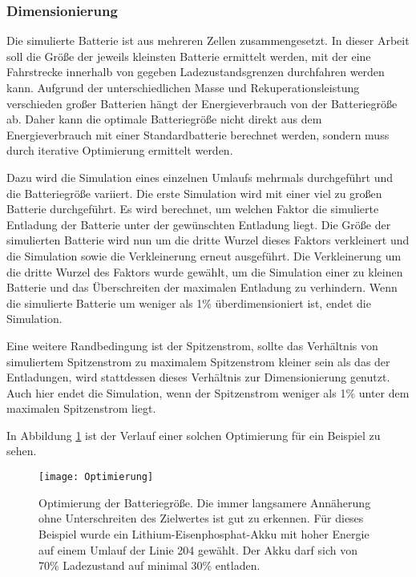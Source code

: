 \subsubsection{Dimensionierung}

Die simulierte Batterie ist aus mehreren Zellen zusammengesetzt. In dieser Arbeit soll die Größe der jeweils kleinsten Batterie ermittelt werden, mit der eine Fahrstrecke innerhalb von gegeben Ladezustandsgrenzen durchfahren werden kann. Aufgrund der unterschiedlichen Masse und Rekuperationsleistung verschieden großer Batterien hängt der Energieverbrauch von der Batteriegröße ab. Daher kann die optimale Batteriegröße nicht direkt aus dem Energieverbrauch mit einer Standardbatterie berechnet werden, sondern muss durch iterative Optimierung ermittelt werden.

Dazu wird die Simulation eines einzelnen Umlaufs mehrmals durchgeführt und die Batteriegröße variiert. Die erste Simulation wird mit einer viel zu großen Batterie durchgeführt. Es wird berechnet, um welchen Faktor die simulierte Entladung der Batterie unter der gewünschten Entladung liegt. Die Größe der simulierten Batterie wird nun um die dritte Wurzel dieses Faktors verkleinert und die Simulation sowie die Verkleinerung erneut ausgeführt. Die Verkleinerung um die dritte Wurzel des Faktors wurde gewählt, um die Simulation einer zu kleinen Batterie und das Überschreiten der maximalen Entladung zu verhindern. Wenn die simulierte Batterie um weniger als 1\% überdimensioniert ist, endet die Simulation.

Eine weitere Randbedingung ist der Spitzenstrom, sollte das Verhältnis von simuliertem Spitzenstrom zu maximalem Spitzenstrom kleiner sein als das der Entladungen, wird stattdessen dieses Verhältnis zur Dimensionierung genutzt. Auch hier endet die Simulation, wenn der Spitzenstrom weniger als 1\% unter dem maximalen Spitzenstrom liegt.

In Abbildung \ref{abb_Optimierung} ist der Verlauf einer solchen Optimierung für ein Beispiel zu sehen.

\begin{figure}\centering
	\texttt{[image: Optimierung]}
	\caption[Optimierung der Batteriegröße]{Optimierung der Batteriegröße. Die immer langsamere Annäherung ohne Unterschreiten des Zielwertes ist gut zu erkennen. Für dieses Beispiel wurde ein Lithium-Eisenphosphat-Akku mit hoher Energie auf einem Umlauf der Linie 204 gewählt. Der Akku darf sich von 70\% Ladezustand auf minimal 30\% entladen.}
	\label{abb_Optimierung}
\end{figure}


